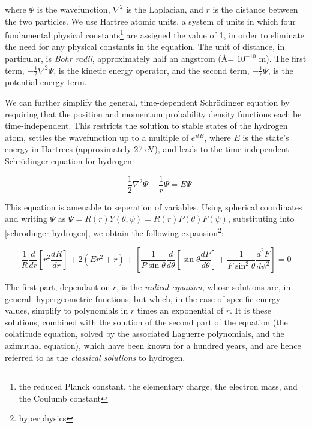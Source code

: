 \documentclass{article}
\begin{document}
where $\Psi$ is the wavefunction, $\nabla^2$ is the Laplacian,
and $r$ is the distance between the two particles.  We use Hartree atomic units,
a system of units in which four fundamental physical constants\footnote{the reduced Planck
constant, the elementary charge, the electron mass, and the Coulumb constant} are
assigned the value of 1, in order to eliminate the need for any
physical constants in the equation.  The unit of distance, in particular,
is {\it Bohr radii}, approximately half an angstrom (\AA = $10^{-10}$ m).
The first term, $-\frac{1}{2}\nabla^2 \Psi$,
is the kinetic energy operator, and the second term, $-\frac{1}{r}\Psi$, is
the potential energy term.

We can further simplify the general, time-dependent Schr\"odinger equation
by requiring that the position and momentum probability density functions
each be time-independent.  This restricts the solution to stable states
of the hydrogen atom, settles the wavefunction up to a multiple of $e^{itE}$,
where $E$ is the state's energy in Hartrees (approximately 27 eV),
and leads to the time-independent Schr\"odinger equation for hydrogen:

\begin{equation}
\label{schrodinger hydrogen}
-\frac{1}{2}\nabla^2 \Psi - \frac{1}{r}\Psi = E \Psi
\end{equation}

This equation is amenable to seperation of variables.
Using spherical coordinates and writing $\Psi$ as $\Psi=R(r)Y(\theta, \psi) = R(r)P(\theta)F(\psi)$,
substituting into \eqref{schrodinger hydrogen}, we obtain the following expansion\footnote{hyperphysics}:

\begin{equation*}
\frac{1}{R} \frac{d}{dr}\left[ r^2 \frac{dR}{dr}\right] + 2(Er^2 + r)
+ \left[\frac{1}{P\sin\theta} \frac{d}{d\theta}\left[\sin\theta\frac{dP}{d\theta}\right]+\frac{1}{F\sin^2\theta}\frac{d^2 F}{d\psi^2}\right] = 0
\end{equation*}

The first part, dependant on $r$, is the {\it radical equation}, whose solutions are, in general.
hypergeometric functions, but which, in the case of specific energy values,
simplify to polynomials in $r$
times an exponential of $r$.  It is these solutions, combined with the solution
of the second part of the equation (the colatitude equation, solved by the associated Laguerre polynomials,
and the azimuthal equation), which have been known for a hundred years, and are
hence referred to as the {\it classical solutions} to hydrogen.
\end{document}

